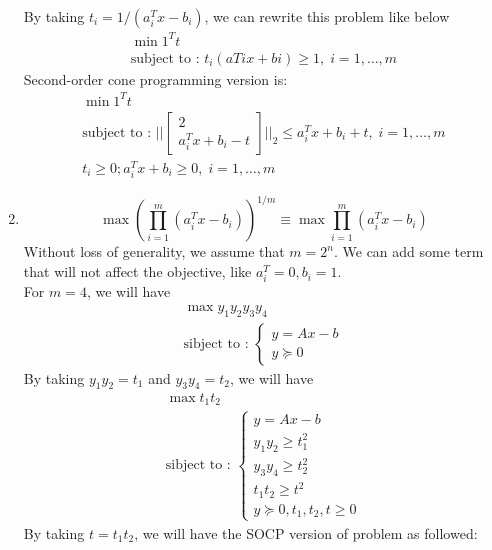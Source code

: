 \begin{latin}
\begin{enumerate}
	By taking $ t_{i} = 1/(a^{T}_{i} x - b_{i}) $, we can rewrite this problem like below
		\begin{gather*}
			\min 1^{T}t
			\\
			\text{subject to : } t_{i}(aT i x + bi) \geq 1, \; i = 1,\dots,m
		\end{gather*}
	Second-order cone programming version is:
		\begin{gather*}
			\min 1^{T}t
			\\
			\text{subject to : } \Bigg|\Bigg| 
				\begin{bmatrix}
					2 
					\\
					a_{i}^{T}x + b_{i} - t
				\end{bmatrix}
			  \Bigg|\Bigg|_{2} \leq a_{i}^{T}x + b_{i} + t, \; i = 1,\dots,m
			  \\
			  t_{i} ≥ 0; a^{T}_{i} x + b_{i} \geq 0, \; i = 1,\dots,m
		\end{gather*}
	\item
	\begin{equation*}
		\max (\prod_{i=1}^{m} (a^{T}_{i} x - b_{i}))^{1/m} \equiv \max \prod_{i=1}^{m} (a^{T}_{i} x - b_{i})
	\end{equation*}
	Without loss of generality, we assume that $ m = 2^{n} $. We can add some term that will not affect the objective, like $ a^{T}_{i}=0, b_{i} = 1 $.
	\\
	For $ m=4 $, we will have
	\begin{gather*}
		\max y_{1}y_{2}y_{3}y_{4}
		\\
		\text{sibject to : }
		\begin{cases}
			y = Ax - b
			\\
			y \succeq 0 
		\end{cases} 
	\end{gather*}
	By taking $ y_{1}y_{2} = t_{1} $ and $ y_{3}y_{4} = t_{2} $, we will have 
	\begin{gather*}
		\max t_{1}t_{2} \\
		\text{sibject to : }
		\begin{cases}
			y = Ax - b \\
			y_{1}y_{2} \geq t^{2}_{ 1} \\
			y_{3}y_{4} \geq t^{2}_{ 2} \\
			t_{1} t_{2} \geq t^{2} \\
			y \succeq 0, t_{1}, t_{2}, t \geq 0
		\end{cases} 
	\end{gather*} 
	By taking $ t = t_{1}t_{2} $, we will have the SOCP version of problem as followed:

\end{enumerate}
\end{latin}
